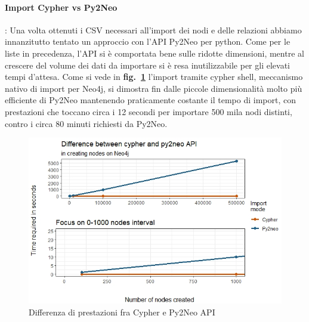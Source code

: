 \documentclass[fleqn,10pt]{SelfArx} %
\begin{document}
{{\paragraph{Import Cypher vs Py2Neo}: Una volta ottenuti i CSV necessari all'import dei nodi e delle relazioni abbiamo innanzitutto tentato un approccio con l'API Py2Neo per python. Come per le liste in precedenza, l'API si è comportata bene sulle ridotte dimensioni, mentre al crescere del volume dei dati da importare si è resa inutilizzabile per gli elevati tempi d'attesa. Come si vede in \textbf{fig.~\ref{plot_cypher_py2neo}} l'import tramite cypher shell, meccanismo nativo di import per Neo4j, si dimostra fin dalle piccole dimensionalità molto più efficiente di Py2Neo mantenendo praticamente costante il tempo di import, con prestazioni che toccano circa i 12 secondi per importare 500 mila nodi distinti, contro i circa 80 minuti richiesti da Py2Neo.
\begin{figure}
\centering
\includegraphics[scale=0.54]{viz_benchmark_cypher_py2neo.jpeg}
\caption{\label{plot_cypher_py2neo} Differenza di prestazioni fra Cypher e Py2Neo API}
\end{figure}
}}
\end{document}
